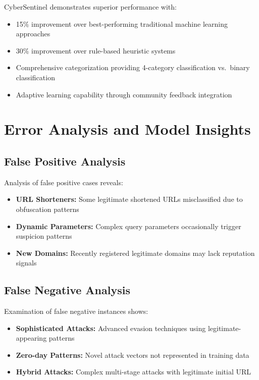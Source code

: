 CyberSentinel demonstrates superior performance with:
\begin{itemize}
	\item 15\% improvement over best-performing traditional machine learning approaches
	\item 30\% improvement over rule-based heuristic systems
	\item Comprehensive categorization providing 4-category classification vs.\ binary classification
	\item Adaptive learning capability through community feedback integration
\end{itemize}

\section{Error Analysis and Model Insights}

\subsection{False Positive Analysis}

Analysis of false positive cases reveals:
\begin{itemize}
	\item \textbf{URL Shorteners:} Some legitimate shortened URLs misclassified due to obfuscation patterns
	\item \textbf{Dynamic Parameters:} Complex query parameters occasionally trigger suspicion patterns
	\item \textbf{New Domains:} Recently registered legitimate domains may lack reputation signals
\end{itemize}

\subsection{False Negative Analysis}

Examination of false negative instances shows:
\begin{itemize}
	\item \textbf{Sophisticated Attacks:} Advanced evasion techniques using legitimate-appearing patterns
	\item \textbf{Zero-day Patterns:} Novel attack vectors not represented in training data
	\item \textbf{Hybrid Attacks:} Complex multi-stage attacks with legitimate initial URL
\end{itemize}
